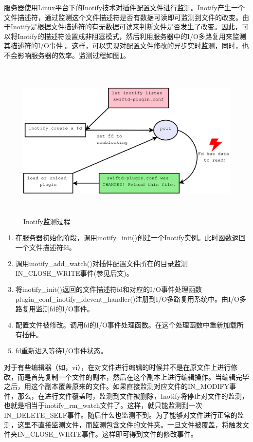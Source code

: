 \documentclass[12pt, twoside, a4paper, xetex]{report}
\begin{document}
	服务器使用Linux平台下的Inotify技术对插件配置文件进行监测。Inotify产生一个文件描述符，通过监测这个文件描述符是否有数据可读即可监测到文件的改变。由于Inotify是根据文件描述符的有无数据可读来判断文件是否发生了改变。因此，可以将Inotify的描述符设置成非阻塞模式，然后利用服务器中的I/O多路复用来监测其描述符的I/O事件 。这样，可以实现对配置文件修改的异步实时监测，同时，也不会影响服务器的效率。监测过程如图\ref{inotify}。
	
	\begin{figure}[htbp]
	\centering
	\caption{Inotify监测过程}
	\label{inotify}
	\includegraphics[height=8cm, width=15cm]{pics/inotify.eps}
	\end{figure}
	
	\begin{enumerate}
		\item 在服务器初始化阶段，调用inotify\_init()创建一个Inotify实例。此时函数返回一个文件描述符fd。
		\item 调用inotify\_add\_watch()对插件配置文件所在的目录监测IN\_CLOSE\_WRITE事件(参见后文)。
		\item 将inotify\_init()返回的文件描述符fd和对应的I/O事件处理函数\\plugin\_conf\_inotify\_fdevent\_handler()注册到I/O多路复用系统中。由I/O多路复用监测fd的I/O事件。
		\item 配置文件被修改。调用fd的I/O事件处理函数。在这个处理函数中重新加载所有插件。
		\item fd重新进入等待I/O事件状态。
	\end{enumerate}
	
	对于有些编辑器（如，vi），在对文件进行编辑的时候并不是在原文件上进行修改，而是首先复制一个文件的副本，然后在这个副本上进行编辑操作。当编辑完毕之后，用这个副本覆盖原来的文件。如果直接监测对应文件的IN\_MODIFY事件，那么，在进行文件覆盖时，监测到文件被删除，Inotify将停止对文件的监测，也就是相当于inotify\_rm\_watch文件了。这样，就只能监测到一次IN\_DELETE\_SELF事件。随后什么也监测不到。为了能够对文件进行正常的监测，这里不直接监测文件，而监测包含文件的文件夹。一旦文件被覆盖，将触发文件夹IN\_CLOSE\_WIRTE事件。这样即可得到文件的修改事件。
	
\end{document}

